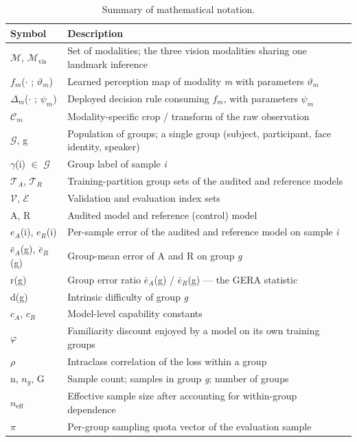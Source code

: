\begin{table}[pos=htbp]
\centering
\caption{Summary of mathematical notation.}
\label{tab:3}
\footnotesize
\begin{tabularx}{\textwidth}{XX}
\toprule
\textbf{Symbol} & \textbf{Description} \\
\midrule
$\mathcal{M}$, $\mathcal{M}_{\mathrm{vis}}$ & Set of modalities; the three vision modalities sharing one landmark inference \\
$f_{m}$($\cdot$ ; $\vartheta_{m}$) & Learned perception map of modality \emph{m} with parameters $\vartheta_{m}$ \\
$\Delta_{m}$($\cdot$ ; $\psi_{m}$) & Deployed decision rule consuming $f_{m}$, with parameters $\psi_{m}$ \\
$\mathcal{C}_{m}$ & Modality-specific crop / transform of the raw observation \\
$\mathcal{G}$, g & Population of groups; a single group (subject, participant, face identity, speaker) \\
$\gamma$(i) $\in$ $\mathcal{G}$ & Group label of sample \emph{i} \\
$\mathcal{T}_{A}$, $\mathcal{T}_{R}$ & Training-partition group sets of the audited and reference models \\
$\mathcal{V}$, $\mathcal{E}$ & Validation and evaluation index sets \\
A, R & Audited model and reference (control) model \\
$e_{A}$(i), $e_{R}$(i) & Per-sample error of the audited and reference model on sample \emph{i} \\
$\bar{e}_{A}$(g), $\bar{e}_{R}$(g) & Group-mean error of A and R on group \emph{g} \\
r(g) & Group error ratio $\bar{e}_{A}$(g) / $\bar{e}_{R}$(g) --- the GERA statistic \\
d(g) & Intrinsic difficulty of group \emph{g} \\
$c_{A}$, $c_{R}$ & Model-level capability constants \\
$\varphi$ & Familiarity discount enjoyed by a model on its own training groups \\
$\rho$ & Intraclass correlation of the loss within a group \\
n, $n_{g}$, G & Sample count; samples in group \emph{g}; number of groups \\
$n_{\mathrm{eff}}$ & Effective sample size after accounting for within-group dependence \\
$\pi$ & Per-group sampling quota vector of the evaluation sample \\

\end{tabularx}
\end{table}
